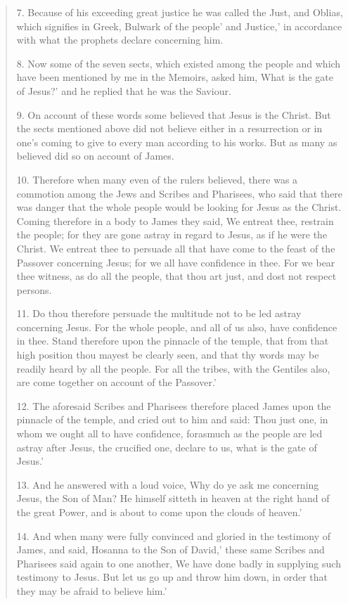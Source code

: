 \documentclass[11pt]{article}
\begin{document}
\begin{thebibliography}{37}
\begin{quote}
7. Because of his exceeding great justice he was called the Just, and Oblias, which signifies in Greek, Bulwark of the people' and Justice,' in accordance with what the prophets declare concerning him.

8. Now some of the seven sects, which existed among the people and which have been mentioned by me in the Memoirs, asked him, What is the gate of Jesus?' and he replied that he was the Saviour.

9. On account of these words some believed that Jesus is the Christ. But the sects mentioned above did not believe either in a resurrection or in one's coming to give to every man according to his works. But as many as believed did so on account of James.

10. Therefore when many even of the rulers believed, there was a commotion among the Jews and Scribes and Pharisees, who said that there was danger that the whole people would be looking for Jesus as the Christ. Coming therefore in a body to James they said, We entreat thee, restrain the people; for they are gone astray in regard to Jesus, as if he were the Christ. We entreat thee to persuade all that have come to the feast of the Passover concerning Jesus; for we all have confidence in thee. For we bear thee witness, as do all the people, that thou art just, and dost not respect persons.

11. Do thou therefore persuade the multitude not to be led astray concerning Jesus. For the whole people, and all of us also, have confidence in thee. Stand therefore upon the pinnacle of the temple, that from that high position thou mayest be clearly seen, and that thy words may be readily heard by all the people. For all the tribes, with the Gentiles also, are come together on account of the Passover.'

12. The aforesaid Scribes and Pharisees therefore placed James upon the pinnacle of the temple, and cried out to him and said: Thou just one, in whom we ought all to have confidence, forasmuch as the people are led astray after Jesus, the crucified one, declare to us, what is the gate of Jesus.'

13. And he answered with a loud voice, Why do ye ask me concerning Jesus, the Son of Man? He himself sitteth in heaven at the right hand of the great Power, and is about to come upon the clouds of heaven.'

14. And when many were fully convinced and gloried in the testimony of James, and said, Hosanna to the Son of David,' these same Scribes and Pharisees said again to one another, We have done badly in supplying such testimony to Jesus. But let us go up and throw him down, in order that they may be afraid to believe him.'


\end{quote}
\end{thebibliography}
\end{document}
